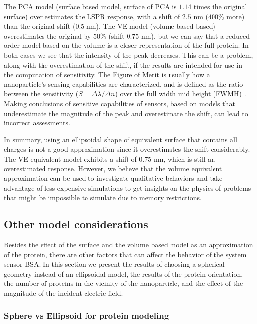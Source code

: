 The PCA model (surface based model, surface of PCA is $1.14$ times the original surface) over estimates the LSPR response, 
with a shift of $2.5$ nm ($400\%$ more) than the original shift ($0.5$ nm). The VE model (volume based based)  
overestimates the original by $50\%$ (shift $0.75$ nm), but we can say that a reduced order model based on the volume 
is a closer representation of the full protein. In both cases we see that the intensity of the peak decreases. This can be 
a problem, along with the overestimation of the shift, if the results are intended for use in the computation of sensitivity. The Figure of
Merit is usually how a nanoparticle's sensing capabilities are characterized, and is defined as the ratio between the 
sensitivity ($S = \Delta \lambda / \Delta n$) over the full width mid height (FWMH) \cite{otte2012}. Making 
conclusions of sensitive capabilities of sensors, based on models that underestimate the magnitude of the peak and 
overestimate the shift, can lead to incorrect assessments.

In summary, using an ellipsoidal shape of equivalent surface that contains all charges is not a good approximation
since it overestimates the shift considerably. The VE-equivalent model exhibits a shift of $0.75$ nm, which is still  
an overestimated response. However, we believe that the volume equivalent approximation can be used to investigate 
qualitative behaviors and take advantage of less expensive simulations to get insights on the physics of problems 
that might be impossible to simulate due to memory restrictions.

\subsection{Other model considerations}

Besides the effect of the surface and the volume based model as an approximation of the protein, there are other
factors that can affect the behavior of the system sensor-BSA. In this section we present the results of choosing a spherical 
geometry instead of an ellipsoidal model, the results of the protein orientation, the number of proteins in the vicinity of the nanoparticle, and 
the effect of the magnitude of the incident electric field. 

\subsubsection{Sphere vs Ellipsoid for protein modeling}

